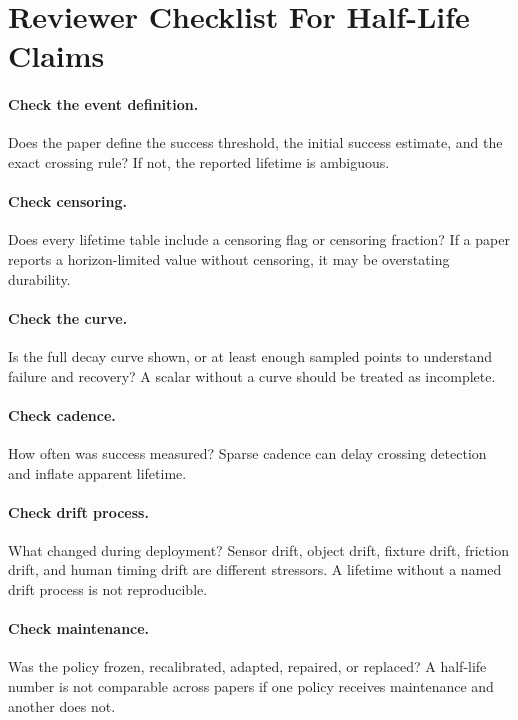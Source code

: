 \documentclass{article}
\begin{document}
\section{Reviewer Checklist For Half-Life Claims}

\paragraph{Check the event definition.}
Does the paper define the success threshold, the initial success estimate, and
the exact crossing rule? If not, the reported lifetime is ambiguous.

\paragraph{Check censoring.}
Does every lifetime table include a censoring flag or censoring fraction? If a
paper reports a horizon-limited value without censoring, it may be overstating
durability.

\paragraph{Check the curve.}
Is the full decay curve shown, or at least enough sampled points to understand
failure and recovery? A scalar without a curve should be treated as incomplete.

\paragraph{Check cadence.}
How often was success measured? Sparse cadence can delay crossing detection and
inflate apparent lifetime.

\paragraph{Check drift process.}
What changed during deployment? Sensor drift, object drift, fixture drift,
friction drift, and human timing drift are different stressors. A lifetime
without a named drift process is not reproducible.

\paragraph{Check maintenance.}
Was the policy frozen, recalibrated, adapted, repaired, or replaced? A
half-life number is not comparable across papers if one policy receives
maintenance and another does not.
\end{document}
